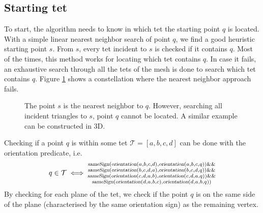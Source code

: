 \documentclass[../thesis.tex]{subfiles}
\begin{document}
\subsection{Starting tet}\label{subsec:starttet}
To start, the algorithm needs to know in which tet the starting point $q$ is located.
With a simple linear nearest neighbor search of point $q$, we find a good heuristic starting point
$s$. From $s$, every tet incident to $s$ is checked if it contains $q$.
Most of the times, this
method works for locating which tet contains $q$. In case it fails,
an exhaustive search through all the tets of the mesh is done to search
which tet contains $q$. Figure \ref{fig:fail} shows a constellation where the nearest
neighbor approach fails.
\begin{figure}[htb]
  \centering
  \def\svgwidth{10em}
  
  \caption{The point $s$ is the nearest neighbor to $q$. However, searching all incident triangles to $s$, point $q$ cannot be located.
  A similar example can be constructed in 3D.
  }\label{fig:fail}
\end{figure}
Checking if a point $q$ is within some tet $\mathcal{T}= [a,b,c,d]$ can be done with the orientation predicate, i.e.
$$q \in \mathcal{T} \iff \substack{
  \textsl{sameSign}(\textsl{orientation}(a,b,c,d), \textsl{orientation}(a,b,c,q)) \&\& \\
  \textsl{sameSign}(\textsl{orientation}(b,c,d,a), \textsl{orientation}(b,c,d,q)) \&\& \\
  \textsl{sameSign}(\textsl{orientation}(c,d,a,b), \textsl{orientation}(c,d,a,q)) \&\& \\
  \textsl{sameSign}(\textsl{orientation}(d,a,b,c), \textsl{orientation}(d,a,b,q))
}$$
By checking for each plane of the tet, we check if the point $q$ is on the same side of the plane 
(characterised by the same orientation sign) as the remaining vertex.
\end{document}
